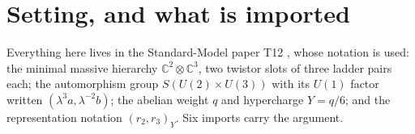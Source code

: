 \documentclass[11pt]{article}
\theoremstyle{definition}
\theoremstyle{plain}
\providecommand{\C}{}\renewcommand{\C}{\mathbb{C}}
\begin{document}
\noindent{}
\newpage

\section{Setting, and what is imported}

\label{c:note.lepton.setting-setting-what-imported}
Everything here lives in the Standard-Model paper T12 \cite{ButlerT12}, whose notation is used: the minimal massive hierarchy $\C^{2} \otimes \C^{3}$, two twistor slots of three ladder pairs each; the automorphism group $S(U(2) \times U(3))$ with its $U(1)$ factor written $(\lambda^{3}a, \lambda^{-2}b)$; the abelian weight $q$ and hypercharge $Y = q/6$; and the representation notation $(r_{2}, r_{3})_{Y}$. Six imports carry the argument.
\end{document}
